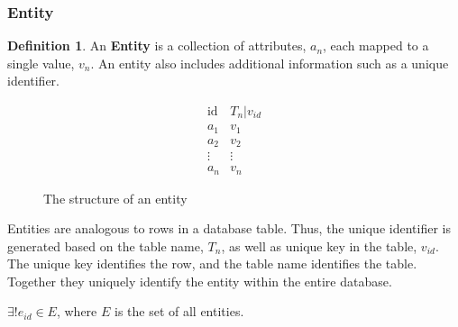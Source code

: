 \documentclass[12pt,letterpaper,oneside,draft]{report}
\theoremstyle{definition}
\newtheorem{defn}{Definition}
\begin{document}
				\subsubsection{Entity}
					\begin{defn}
						An \textbf{Entity} is a collection of attributes, $a_n$, each mapped to a single value, $v_n$.  An entity also includes additional information such as a unique identifier.

						\begin{figure}[!ht]
							\centering
							\[
								\begin{array}{ll}
									\mathrm{id} & T_n|v_{id} \\
									a_1 & v_1 \\
									a_2 & v_2 \\
									\vdots & \vdots \\
									a_n & v_n
								\end{array}
							\]
							\caption{The structure of an entity}
							\label{fig:entity-rep}
						\end{figure}

						Entities are analogous to rows in a database table.  Thus, the unique identifier is generated based on the table name, $T_n$, as well as unique key in the table, $v_{id}$.  The unique key identifies the row, and the table name identifies the table.  Together they uniquely identify the entity within the entire database.

						$\exists! e_{id} \in E$, where $E$ is the set of all entities.
					\end{defn}
\end{document}
